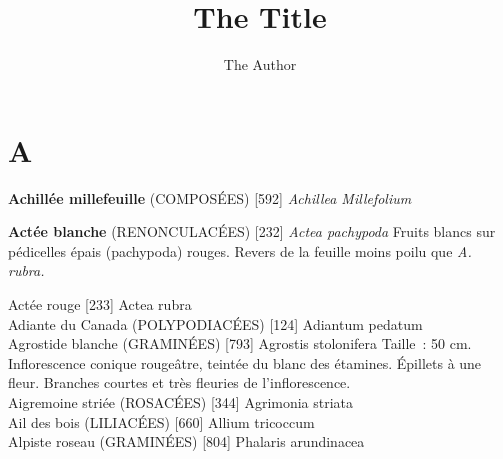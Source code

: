 \documentclass[book,12pt,a4paper,onecolumn,openany]{memoir}
\title{The Title}
\author{The Author}
\begin{document}
\begin{titlingpage}
\maketitle
\end{titlingpage}



\chapter*{A}

\textbf{Achillée millefeuille} (COMPOSÉES)  [592]
\emph{Achillea Millefolium}

\medskip

\noindent\textbf{Actée blanche} (RENONCULACÉES)  [232]			
\emph{Actea pachypoda}
Fruits blancs sur pédicelles épais (pachypoda) rouges.
Revers de la feuille moins poilu que \emph{A. rubra.}

\medskip

\newpage

Actée rouge  [233]							
				Actea rubra\\

Adiante du Canada (POLYPODIACÉES) [124]
				Adiantum pedatum\\

Agrostide blanche (GRAMINÉES)  [793]
				Agrostis stolonifera
Taille : 50 cm. Inflorescence conique rougeâtre, teintée du blanc des étamines.
Épillets à une fleur. Branches courtes et très fleuries de l’inflorescence.\\

Aigremoine striée (ROSACÉES)  [344]
				Agrimonia striata\\

Ail des bois (LILIACÉES)  [660]					
				Allium tricoccum\\

Alpiste roseau (GRAMINÉES)  [804]
				Phalaris arundinacea\\
\end{document}
